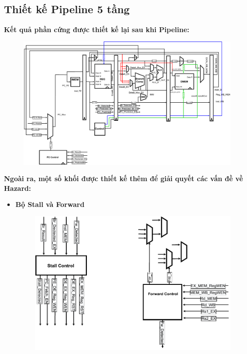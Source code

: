 \documentclass[E:/Latex/ExtraWork/ComputerArchitechture/Report.tex]{subfiles}
\begin{document}
\begin{otherlanguage}{english}
\begin{itemize}
				\section{Thiết kế Pipeline 5 tầng}

				\textbf {Kết quả phần cứng được thiết kế lại sau khi Pipeline:}
				
					\begin{figure}[h!]
						\includegraphics[scale = 0.6]{Figure/pipeline.pdf}
						\centering
					\end{figure}

				\textbf {Ngoài ra, một số khối được thiết kế thêm để giải quyết các vấn đề về Hazard:}
					\begin{itemize}
						\item \textbf {Bộ Stall và Forward}
						\begin{figure}[h!]
							\includegraphics[scale = 0.8]{Figure/S_F.pdf}
							\centering
						\end{figure}


\end{itemize}
\end{itemize}
\end{otherlanguage}
\end{document}
